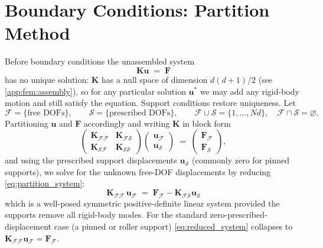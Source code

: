 \section{Boundary Conditions: Partition Method}
\label{app:fem:bcs}

Before boundary conditions the unassembled system
\begin{equation}
  \mathbf{K}\mathbf{u}\;=\;\mathbf{F}
\end{equation}
has no unique solution: $\mathbf{K}$ has a null space of dimension
$d(d+1)/2$ (see \cref{app:fem:assembly}), so for any particular
solution $\mathbf{u}^\ast$ we may add any rigid-body motion and
still satisfy the equation. Support conditions restore
uniqueness. Let
\begin{equation}
  \mathcal{F}=\{\text{free DOFs}\},\qquad
  \mathcal{S}=\{\text{prescribed DOFs}\},\qquad
  \mathcal{F}\cup\mathcal{S}=\{1,\dotsc,Nd\},\quad
  \mathcal{F}\cap\mathcal{S}=\varnothing.
\end{equation}
Partitioning $\mathbf{u}$ and $\mathbf{F}$ accordingly and
writing $\mathbf{K}$ in block form
\begin{equation}
  \begin{pmatrix}\mathbf{K}_{\mathcal{F}\mathcal{F}}&\mathbf{K}_{\mathcal{F}\mathcal{S}}\\
                 \mathbf{K}_{\mathcal{S}\mathcal{F}}&\mathbf{K}_{\mathcal{S}\mathcal{S}}\end{pmatrix}
  \begin{pmatrix}\mathbf{u}_{\mathcal{F}}\\\mathbf{u}_{\mathcal{S}}\end{pmatrix}
  \;=\;
  \begin{pmatrix}\mathbf{F}_{\mathcal{F}}\\\mathbf{F}_{\mathcal{S}}\end{pmatrix},
  \label{eq:partition_system}
\end{equation}
and using the prescribed support displacements
$\mathbf{u}_{\mathcal{S}}$ (commonly zero for pinned supports), we
solve for the unknown free-DOF displacements by reducing
\cref{eq:partition_system}:
\begin{equation}
  \boxed{\;
  \mathbf{K}_{\mathcal{F}\mathcal{F}}\,\mathbf{u}_{\mathcal{F}}
  \;=\;\mathbf{F}_{\mathcal{F}}-\mathbf{K}_{\mathcal{F}\mathcal{S}}\mathbf{u}_{\mathcal{S}}
  \;}
  \label{eq:reduced_system}
\end{equation}
which is a well-posed symmetric positive-definite linear system
provided the supports remove all rigid-body modes. For the
standard zero-prescribed-displacement case (a pinned or roller
support) \cref{eq:reduced_system} collapses to
$\mathbf{K}_{\mathcal{F}\mathcal{F}}\mathbf{u}_{\mathcal{F}}=\mathbf{F}_{\mathcal{F}}$.

